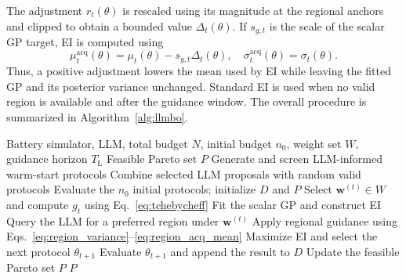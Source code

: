 The adjustment $r_t(\theta)$ is rescaled using its magnitude at the regional
anchors and clipped to obtain a bounded value $\Delta_t(\theta)$. If
$s_{g,t}$ is the scale of the scalar GP target, EI is computed using
\begin{equation}
 \mu_t^{\mathrm{acq}}(\theta)
 =\mu_t(\theta)-s_{g,t}\Delta_t(\theta),
 \quad
 \sigma_t^{\mathrm{acq}}(\theta)=\sigma_t(\theta).
 \label{eq:region_acq_mean}
\end{equation}
Thus, a positive adjustment lowers the mean used by EI while leaving the
fitted GP and its posterior variance unchanged. Standard EI is used when no
valid region is available and after the guidance window.
The overall procedure is summarized in Algorithm~\ref{alg:llmbo}.

\begin{algorithm}[t]
\caption{LLMBO-MO}
\label{alg:llmbo}
\footnotesize
\begin{algorithmic}[1]
\Require Battery simulator, LLM, total budget $N$, initial budget $n_0$, weight set $W$, guidance horizon $T_{\mathrm L}$
\Ensure Feasible Pareto set $P$
\State Generate and screen LLM-informed warm-start protocols
\State Combine selected LLM proposals with random valid protocols
\State Evaluate the $n_0$ initial protocols; initialize $D$ and $P$
    \State Select $\mathbf w^{(t)}\in W$ and compute $g_t$ using Eq.~\eqref{eq:tchebycheff}
    \State Fit the scalar GP and construct EI
        \State Query the LLM for a preferred region under $\mathbf w^{(t)}$
            \State Apply regional guidance using Eqs.~\eqref{eq:region_variance}--\eqref{eq:region_acq_mean}
        \EndIf
    \EndIf
    \State Maximize EI and select the next protocol $\theta_{t+1}$
    \State Evaluate $\theta_{t+1}$ and append the result to $D$
    \State Update the feasible Pareto set $P$
\EndFor
\State \Return $P$
\end{algorithmic}
\end{algorithm}
